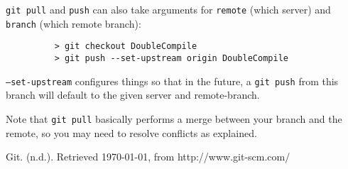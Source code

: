 \documentclass[11pt]{report}
\begin{document}
\texttt{git pull} and \texttt{push} can also take arguments for
\texttt{remote} (which server) and \texttt{branch} (which remote
branch):

\begin{figure}[H]
  \begin{lstlisting}
    > git checkout DoubleCompile
    > git push --set-upstream origin DoubleCompile
  \end{lstlisting}
\end{figure}

\texttt{--set-upstream} configures things so that in the future, a
\texttt{git push} from this branch will default to the given server
and remote-branch.

Note that \texttt{git pull} basically performs a merge between your
branch and the remote, so you may need to resolve conflicts as
explained.

\begin{thebibliography}{9}

    Git. (n.d.). Retrieved \today, from http://www.git-scm.com/

\end{thebibliography}
\end{document}
